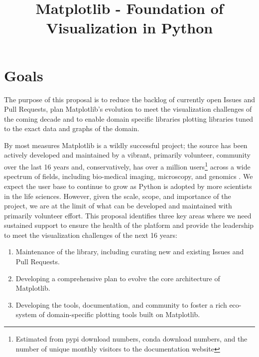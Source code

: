 \documentclass[11pt]{article}  %
\begin{document}
\title{Matplotlib - Foundation of Visualization in Python}
\author{}
\maketitle

\section{Goals}

The purpose of this proposal is to reduce the backlog of currently
open Issues and Pull Requests, plan Matplotlib's evolution to meet the
visualization challenges of the coming decade and to enable domain
specific libraries plotting libraries tuned to the exact data and
graphs of the domain.

By most measures Matplotlib is a wildly successful project; the source
has been actively developed and maintained by a vibrant, primarily
volunteer, community over the last 16 years and, conservatively, has
over a million users\footnote{Estimated from pypi download numbers,
conda download numbers, and the number of unique monthly visitors to
the documentation website} across a wide spectrum of fields, including
bio-medical imaging, microscopy, and genomics
\cite{Carpenter2006,Wolf2018,10.7717/peerj.453}
\cite{Segata2011,10.1371/journal.pgen.1000695,HASHIMSHONY2012666,
  10.1093/bioinformatics/bts480,Carlile2014,Laganowsky2014,Jiangaac9462,
  10.3389/fninf.2014.00014}.  We expect the user base to continue to
grow as Python is adopted by more scientists in the life sciences.
However, given the scale, scope, and importance of the project, we are
at the limit of what can be developed and maintained with primarily
volunteer effort.  This proposal identifies three key areas where we
need sustained support to ensure the health of the platform and
provide the leadership to meet the visualization challenges of the
next 16 years:

\begin{enumerate}[label=\alph*),noitemsep]
  \item Maintenance of the library, including curating new and
    existing Issues and Pull Requests.
  \item Developing a comprehensive plan to evolve the core architecture
    of Matplotlib.
  \item Developing the tools, documentation, and community to foster a
    rich eco-system of domain-specific plotting tools built on
    Matplotlib.
\end{enumerate}
\end{document}
